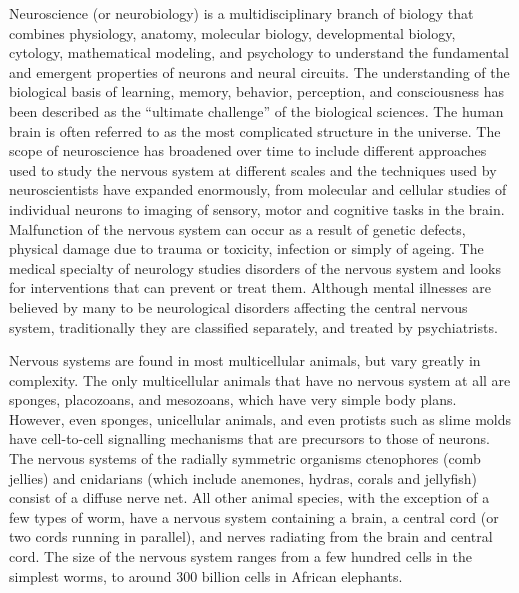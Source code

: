 Neuroscience (or neurobiology) is a multidisciplinary branch of biology that combines physiology, anatomy, molecular biology, developmental biology, cytology, mathematical modeling, and psychology to understand the fundamental and emergent properties of neurons and neural circuits. The understanding of the biological basis of learning, memory, behavior, perception, and consciousness has been described as the ``ultimate challenge'' of the biological sciences. The human brain is often referred to as the most complicated structure in the universe. The scope of neuroscience has broadened over time to include different approaches used to study the nervous system at different scales and the techniques used by neuroscientists have expanded enormously, from molecular and cellular studies of individual neurons to imaging of sensory, motor and cognitive tasks in the brain. Malfunction of the nervous system can occur as a result of genetic defects, physical damage due to trauma or toxicity, infection or simply of ageing. The medical specialty of neurology studies disorders of the nervous system and looks for interventions that can prevent or treat them. Although mental illnesses are believed by many to be neurological disorders affecting the central nervous system, traditionally they are classified separately, and treated by psychiatrists.

Nervous systems are found in most multicellular animals, but vary greatly in complexity. The only multicellular animals that have no nervous system at all are sponges, placozoans, and mesozoans, which have very simple body plans. However, even sponges, unicellular animals, and even protists such as slime molds have cell-to-cell signalling mechanisms that are precursors to those of neurons. The nervous systems of the radially symmetric organisms ctenophores (comb jellies) and cnidarians (which include anemones, hydras, corals and jellyfish) consist of a diffuse nerve net. All other animal species, with the exception of a few types of worm, have a nervous system containing a brain, a central cord (or two cords running in parallel), and nerves radiating from the brain and central cord. The size of the nervous system ranges from a few hundred cells in the simplest worms, to around 300 billion cells in African elephants.

